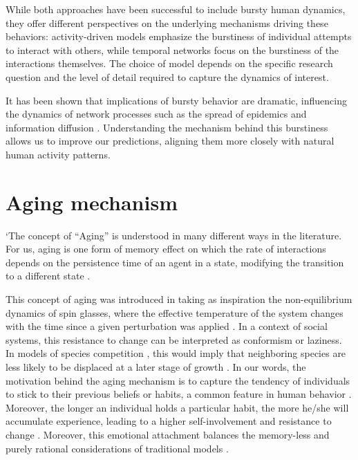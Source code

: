 While both approaches have been successful to include bursty human dynamics, they offer different perspectives on the underlying mechanisms driving these behaviors: activity-driven models emphasize the burstiness of individual attempts to interact with others, while temporal networks focus on the burstiness of the interactions themselves. The choice of model depends on the specific research question and the level of detail required to capture the dynamics of interest.

It has been shown that implications of bursty behavior are dramatic, influencing the dynamics of network processes such as the spread of epidemics and information diffusion \cite{Rocha2013Bursts, Wang2009Viruses}. Understanding the mechanism behind this burstiness allows us to improve our predictions, aligning them more closely with natural human activity patterns.

\section{\label{sec:Aging mechanism} Aging mechanism}

`The concept of ``Aging'' is understood in many different ways in the literature. For us, aging is one form of memory effect on which the rate of interactions depends on the persistence time of an agent in a state, modifying the transition to a different state \cite{fernandez-gracia-2011,perez-2016,boguna-2014}. 

This concept of aging was introduced in \cite{Stark2008} taking as inspiration the non-equilibrium dynamics of spin glasses, where the effective temperature of the system changes with the time since a given perturbation was applied \cite{cugliandolo1993analytical}. In a context of social systems, this resistance to change can be interpreted as conformism or laziness. In models of species competition \cite{ravasz2004spreading}, this would imply that neighboring species are less likely to be displaced at a later stage of growth \cite{Stark2008}. In our words, the motivation behind the aging mechanism is to capture the tendency of individuals to stick to their previous beliefs or habits, a common feature in human behavior \cite{granovetter-1973}. Moreover, the longer an individual holds a particular habit, the more he/she will accumulate experience, leading to a higher self-involvement and resistance to change \cite{lejarraga2011let}. Moreover, this emotional attachment balances the memory-less and purely rational considerations of traditional models \cite{granovetter-1985}.

